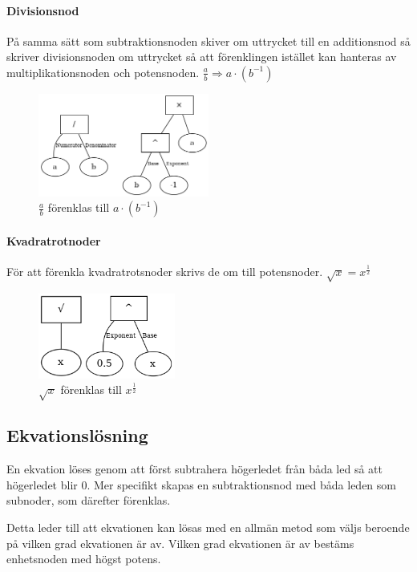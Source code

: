 \documentclass[12pt,a4paper]{article}
\begin{document}
\paragraph{Divisionsnod}
\label{subsubsec:divnode}
På samma sätt som subtraktionsnoden skiver om uttrycket till en additionsnod så skriver divisionsnoden om uttrycket så att förenklingen istället kan hanteras av multiplikationsnoden och potensnoden. \(\frac{a}{b}\Rightarrow a \cdot \left(b^{-1}\right)\)
\begin{figure}[h!]
  \centering
  \includegraphics[width=0.5\textwidth]{image-merged4.png}
  \caption{\(\frac{a}{b}\) förenklas till \(a \cdot \left(b^{-1}\right)\)}
\end{figure}
\paragraph{Kvadratrotnoder}
\label{subsubsec:sqrtnod}
För att förenkla kvadratrotsnoder skrivs de om till potensnoder. \(\sqrt{x}=x^{\frac{1}{2}}\)
\begin{figure}[h!]
  \centering
  \includegraphics[width=0.4\textwidth]{sqrt.png}
  \caption{\(\sqrt{x}\) förenklas till \(x^{\frac{1}{2}}\)}
\end{figure}
\subsection{Ekvationslösning}
En ekvation löses genom att först subtrahera högerledet från båda led så att högerledet blir 0. Mer specifikt skapas en subtraktionsnod med båda leden som subnoder, som därefter förenklas. 
\par Detta leder till att ekvationen kan lösas med en allmän metod som väljs beroende på vilken grad ekvationen är av. Vilken grad ekvationen är av bestäms enhetsnoden med högst potens.
\end{document}
